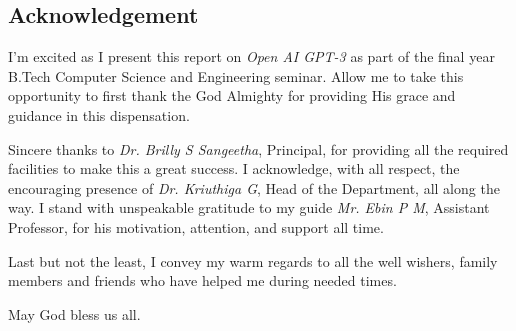 \newpage
\vspace*{\fill}
\begin{center}
    \section*{Acknowledgement}
\end{center}

I'm excited as I present this report on \emph{Open AI GPT-3} as part of the final year B.Tech Computer Science and Engineering seminar. Allow me to take this opportunity to first thank the God Almighty for providing His grace and guidance in this dispensation.

Sincere thanks to \emph{Dr. Brilly S Sangeetha}, Principal, for providing all the required facilities to make this a great success. I acknowledge, with all respect, the encouraging presence of \emph{Dr. Kriuthiga G}, Head of the Department, all along the way. I stand with unspeakable gratitude to my guide \emph{Mr. Ebin P M}, Assistant Professor, for his motivation, attention, and support all time.

Last but not the least, I convey my warm regards to all the well wishers, family members and friends who have helped me during needed times.

\vspace{0.5em}
\begin{center}
    May God bless us all.
\end{center}
\vspace*{\fill}